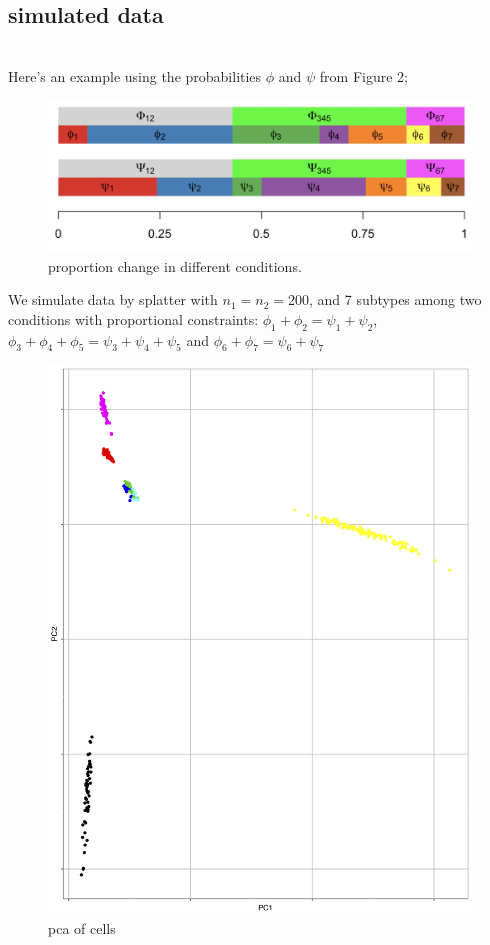 \documentclass[11pt]{amsart}
\begin{document}
\subsection{simulated data}\hfill\\
Here's an example using the probabilities $\phi$ and $\psi$ from Figure 2;
\begin{figure}[h!]
  \includegraphics[width=\linewidth]{prop.png}
  \caption{proportion change in different conditions.}
  \label{fig:1}
\end{figure}
We simulate data by splatter\cite{ref:Zappia} with $n_1=n_2=200$, and 7 subtypes among two conditions with proportional constraints: $\phi_1 + \phi_2 = \psi_1 + \psi_2$, $\phi_3 + \phi_4 +\phi_5 = \psi_3 + \psi_4 + \psi_5$ and $\phi_6 + \phi_7 = \psi_6 + \psi_7$

\begin{figure}[h!]
  \includegraphics[scale = 0.2]{pca2.png}
  \caption{pca of cells}
  \label{fig:2}
\end{figure}
 
\end{document}
